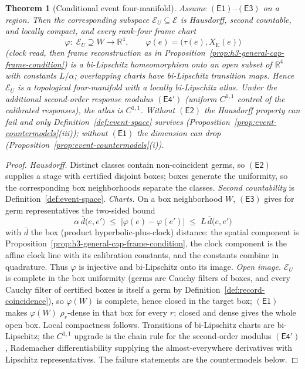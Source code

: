 \documentclass[11pt]{article}
\newtheorem{theorem}{Theorem}[section]
\begin{document}
\begin{theorem}[Conditional event four-manifold]
\label{thm:event-4-manifold}
Assume \(\mathsf{(E1)}\)--\(\mathsf{(E3)}\) on a region. Then the
corresponding subspace \(\mathcal E_U\subseteq\mathcal E\) is Hausdorff,
second countable, and locally compact, and every rank-four frame chart
\[
\varphi:\;\mathcal E_U\supseteq W\longrightarrow\mathbb R^4,
\qquad
\varphi(e)=\bigl(\tau(e),X_{\mathrm E}(e)\bigr)
\]
(clock read, then frame reconstruction as in
Proposition~\ref{prop:h3-general-cap-frame-condition}) is a bi-Lipschitz
homeomorphism onto an open subset of \(\mathbb R^4\) with constants
\(L/\alpha\); overlapping charts have bi-Lipschitz transition maps. Hence
\(\mathcal E_U\) is a topological four-manifold with a locally bi-Lipschitz
atlas. Under the additional second-order response modulus
\(\mathsf{(E4')}\) (uniform \(C^{1,1}\) control of the calibrated responses),
the atlas is \(C^{1,1}\). Without \(\mathsf{(E2)}\) the Hausdorff property can
fail and only Definition~\ref{def:event-space} survives
(Proposition~\ref{prop:event-countermodels}(iii)); without \(\mathsf{(E1)}\)
the dimension can drop
(Proposition~\ref{prop:event-countermodels}(i)).
\end{theorem}

\begin{proof}
\emph{Hausdorff.} Distinct classes contain non-coincident germs, so
\(\mathsf{(E2)}\) supplies a stage with certified disjoint boxes; boxes
generate the uniformity, so the corresponding box neighborhoods separate the
classes. \emph{Second countability} is
Definition~\ref{def:event-space}. \emph{Charts.} On a box neighborhood \(W\),
\(\mathsf{(E3)}\) gives for germ representatives the two-sided bound
\[
\alpha\,\bar d\bigl(e,e'\bigr)\;\leq\;
\bigl|\varphi(e)-\varphi(e')\bigr|\;\leq\;
L\,\bar d\bigl(e,e'\bigr)
\]
with \(\bar d\) the box (product hyperbolic-plus-clock) distance: the spatial
component is Proposition~\ref{prop:h3-general-cap-frame-condition}, the clock
component is the affine clock line with its calibration constants, and the
constants combine in quadrature. Thus \(\varphi\) is injective and
bi-Lipschitz onto its image. \emph{Open image.} \(\mathcal E_U\) is complete
in the box uniformity (germs are Cauchy filters of boxes, and every Cauchy
filter of certified boxes is itself a germ by
Definition~\ref{def:record-coincidence}), so \(\varphi(W)\) is complete,
hence closed in the target box; \(\mathsf{(E1)}\) makes \(\varphi(W)\)
\(\rho_r\)-dense in that box for every \(r\); closed and dense gives the whole
open box. Local compactness follows. Transitions of bi-Lipschitz charts are
bi-Lipschitz; the \(C^{1,1}\) upgrade is the chain rule for the
second-order modulus \(\mathsf{(E4')}\), Rademacher differentiability
supplying the almost-everywhere derivatives with Lipschitz representatives.
The failure statements are the countermodels below.
\end{proof}
\end{document}
